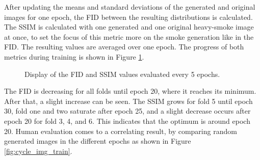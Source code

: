 After updating the means and standard deviations of the generated and original images for one epoch, the FID between the resulting distributions is calculated.
The SSIM is calculated with one generated and one original heavy-smoke image at once, to set the focus of this metric more on the smoke generation like in the FID.
The resulting values are averaged over one epoch.
The progress of both metrics during training is shown in Figure \ref{fig:cycle_metrics}.
\begin{figure}[tb]
    \centering
    \hfill
    \caption[FID and SSIM of CycleGAN]{Display of the FID and SSIM values evaluated every 5 epochs.}\label{fig:cycle_metrics}
\end{figure}
The FID is decreasing for all folds until epoch 20, where it reaches its minimum. 
After that, a slight increase can be seen.
The SSIM grows for fold 5 until epoch 30, fold one and two saturate after epoch 25, and a slight decrease occurs after epoch 20 for fold 3, 4, and 6.
This indicates that the optimum is around epoch 20.
Human evaluation comes to a correlating result, by comparing random generated images in the different epochs as shown in Figure \ref{fig:cycle_img_train}.
